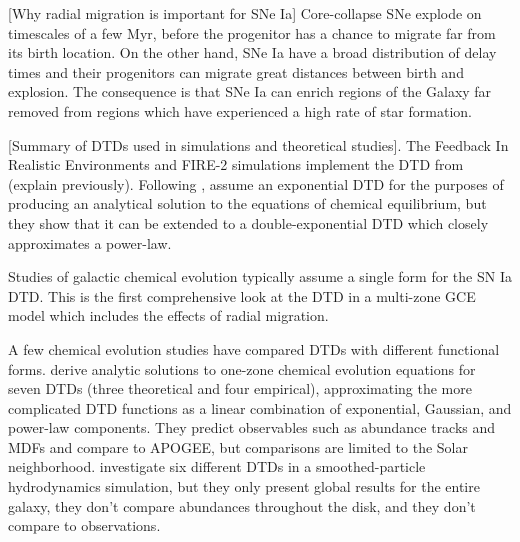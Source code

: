 \documentclass[twocolumn,twocolappendix,linenumbers]{aastex631}
\begin{document}
[Why radial migration is important for SNe Ia]
Core-collapse SNe explode on timescales of a few Myr, before the progenitor has a chance to migrate far from its birth location. On the other hand, SNe Ia have a broad distribution of delay times and their progenitors can migrate great distances between birth and explosion. The consequence is that SNe Ia can enrich regions of the Galaxy far removed from regions which have experienced a high rate of star formation.

[Summary of DTDs used in simulations and theoretical studies]. The Feedback In Realistic Environments \citep[FIRE;][]{Hopkins2014-FIRE-1} and FIRE-2 \citep{Hopkins2018-FIRE-2} simulations implement the DTD from \citet{Mannucci2006-TwoPopulations} (explain previously). Following \citet{Schonrich2009-RadialMixing}, \citet{Weinberg2017-ChemicalEquilibrium} assume an exponential DTD for the purposes of producing an analytical solution to the equations of chemical equilibrium, but they show that it can be extended to a double-exponential DTD which closely approximates a power-law. 

Studies of galactic chemical evolution typically assume a single form for the SN Ia DTD. This is the first comprehensive look at the DTD in a multi-zone GCE model which includes the effects of radial migration.

A few chemical evolution studies have compared DTDs with different functional forms. \citet{Palicio2023-AnalyticDTD} derive analytic solutions to one-zone chemical evolution equations for seven DTDs (three theoretical and four empirical), approximating the more complicated DTD functions as a linear combination of exponential, Gaussian, and power-law components. They predict observables such as abundance tracks and MDFs and compare to APOGEE, but comparisons are limited to the Solar neighborhood. \citet{Poulhazan2018-PrecisionPollution} investigate six different DTDs in a smoothed-particle hydrodynamics simulation, but they only present global results for the entire galaxy, they don't compare abundances throughout the disk, and they don't compare to observations.
\end{document}
